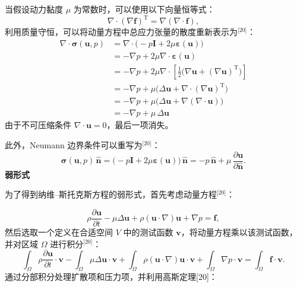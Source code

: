 当假设动力黏度 $\mu$ 为常数时，可以使用以下向量恒等式：
$$
\nabla \cdot
\left(\nabla \mathbf{f}\right)^{\mathrm{T}}
= \nabla
\left(\nabla \cdot \mathbf{f}\right),~
$$
利用质量守恒，可以将动量方程中总应力张量的散度重新表示为\(^\text{[20]}\)：
$$
\begin{aligned}
\nabla \cdot \boldsymbol{\sigma}(\mathbf{u}, p)
&= \nabla \cdot \big(-p\mathbf{I} + 2\mu \boldsymbol{\varepsilon}(\mathbf{u})\big)\\
&= -\nabla p + 2\mu \nabla \cdot \boldsymbol{\varepsilon}(\mathbf{u})\\
&= -\nabla p + 2\mu \nabla \cdot
  \left[\tfrac{1}{2}
  \big(\nabla \mathbf{u} + (\nabla \mathbf{u})^{\mathrm{T}}\big)
  \right]\\
&= -\nabla p + \mu
  \big(\Delta \mathbf{u} + \nabla \cdot (\nabla \mathbf{u})^{\mathrm{T}}\big)\\
&= -\nabla p + \mu
  \big(\Delta \mathbf{u} + \nabla (\nabla \cdot \mathbf{u})\big)\\
&= -\nabla p + \mu \,\Delta \mathbf{u}
\end{aligned}~
$$
由于不可压缩条件 $\nabla \cdot \mathbf{u} = 0$，最后一项消失。

此外，Neumann 边界条件可以重写为\(^\text{[20]}\)：
$$
\boldsymbol{\sigma}(\mathbf{u}, p)\,\hat{\mathbf{n}}
=
\big(-p\mathbf{I} + 2\mu \boldsymbol{\varepsilon}(\mathbf{u})\big)\,\hat{\mathbf{n}}
=
-p \,\hat{\mathbf{n}}
+ \mu \,\frac{\partial \mathbf{u}}{\partial \hat{\mathbf{n}}}.~
$$
\textbf{弱形式}

为了得到纳维–斯托克斯方程的弱形式，首先考虑动量方程\(^\text{[20]}\)：

$$
\rho \frac{\partial \mathbf{u}}{\partial t}
-\mu \Delta \mathbf{u}
+\rho (\mathbf{u} \cdot \nabla)\mathbf{u}
+\nabla p
= \mathbf{f},~
$$
然后选取一个定义在合适空间 $V$ 中的测试函数 $\mathbf{v}$，将动量方程乘以该测试函数，并对区域 $\Omega$ 进行积分\(^\text{[20]}\)：
$$
\int_{\Omega} 
\rho \frac{\partial \mathbf{u}}{\partial t} \cdot \mathbf{v}
-
\int_{\Omega} 
\mu \Delta \mathbf{u} \cdot \mathbf{v}
+
\int_{\Omega} 
\rho (\mathbf{u} \cdot \nabla)\mathbf{u} \cdot \mathbf{v}
+
\int_{\Omega} 
\nabla p \cdot \mathbf{v}
=
\int_{\Omega} 
\mathbf{f} \cdot \mathbf{v}.~
$$
通过分部积分处理扩散项和压力项，并利用高斯定理[20]：

